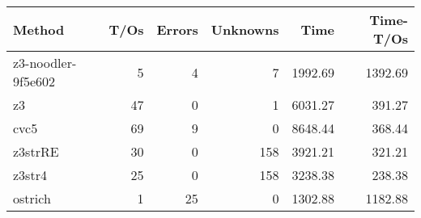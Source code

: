 \begin{tabular}{lrrrrr}
\hline
 Method             &   T/Os &   Errors &   Unknowns &    Time &   Time-T/Os \\
\hline
 z3-noodler-9f5e602 &      5 &        4 &          7 & 1992.69 &     1392.69 \\
 z3                 &     47 &        0 &          1 & 6031.27 &      391.27 \\
 cvc5               &     69 &        9 &          0 & 8648.44 &      368.44 \\
 z3strRE            &     30 &        0 &        158 & 3921.21 &      321.21 \\
 z3str4             &     25 &        0 &        158 & 3238.38 &      238.38 \\
 ostrich            &      1 &       25 &          0 & 1302.88 &     1182.88 \\
\hline
\end{tabular}

